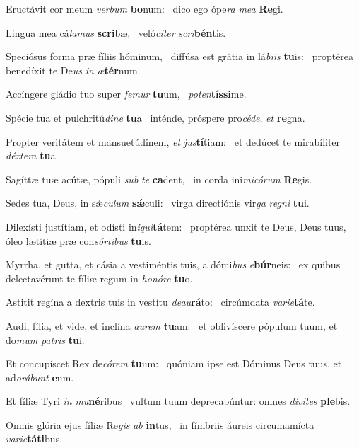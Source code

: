 \item Eructávit cor meum \textit{verbum} \textbf{bo}num:~\psstar{} dico ego ópe\textit{ra} \textit{mea} \textbf{Re}gi.
\item Lingua mea cá\textit{lamus} \textbf{scri}bæ,~\psstar{} veló\textit{citer} \textit{scri}\textbf{bén}tis.
\item Speciósus forma præ fíliis hóminum,~\pscross{} diffúsa est grátia in lá\textit{biis} \textbf{tu}is:~\psstar{} proptérea benedíxit te De\textit{us} \textit{in} \textit{æ}\textbf{tér}num.
\item Accíngere gládio tuo super \textit{femur} \textbf{tu}um,~\psstar{} \textit{poten}\textbf{tís}\textbf{si}me.
\item Spécie tua et pulchritú\textit{dine} \textbf{tu}a~\psstar{} inténde, próspere pro\textit{céde}, \textit{et} \textbf{re}gna.
\item Propter veritátem et mansuetúdinem, \textit{et} \textit{jus}\textbf{tí}tiam:~\psstar{} et dedúcet te mirabíliter \textit{déxtera} \textbf{tu}a.
\item Sagíttæ tuæ acútæ, pópuli \textit{sub} \textit{te} \textbf{ca}dent,~\psstar{} in corda ini\textit{micórum} \textbf{Re}gis.
\item Sedes tua, Deus, in sǽ\textit{culum} \textbf{sǽ}culi:~\psstar{} virga directiónis vir\textit{ga} \textit{regni} \textbf{tu}i.
\item Dilexísti justítiam, et odísti in\textit{iqui}\textbf{tá}tem:~\psstar{} proptérea unxit te Deus, Deus tuus, óleo lætítiæ præ con\textit{sórtibus} \textbf{tu}is.
\item Myrrha, et gutta, et cásia a vestiméntis tuis, a dómi\textit{bus} \textit{e}\textbf{búr}neis:~\psstar{} ex quibus delectavérunt te fíliæ regum in \textit{honóre} \textbf{tu}o.
\item Astitit regína a dextris tuis in vestítu \textit{deau}\textbf{rá}to:~\psstar{} circúmdata \textit{varie}\textbf{tá}te.
\item Audi, fília, et vide, et inclína \textit{aurem} \textbf{tu}am:~\psstar{} et oblivíscere pópulum tuum, et do\textit{mum} \textit{patris} \textbf{tu}i.
\item Et concupíscet Rex de\textit{córem} \textbf{tu}um:~\psstar{} quóniam ipse est Dóminus Deus tuus, et ad\textit{orábunt} \textbf{e}um.
\item Et fíliæ Tyri \textit{in} \textit{mu}\textbf{né}ribus~\psstar{} vultum tuum deprecabúntur: omnes \textit{dívites} \textbf{ple}bis.
\item Omnis glória ejus fíliæ Re\textit{gis} \textit{ab} \textbf{in}tus,~\psstar{} in fímbriis áureis circumamícta \textit{varie}\textbf{tá}\textbf{ti}bus.
